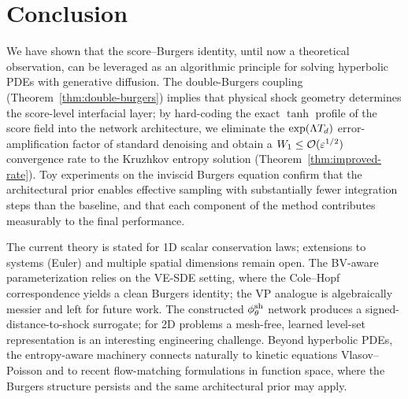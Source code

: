 %
\section{Conclusion}
\label{sec:conclusion}

We have shown that the score--Burgers identity, until now a theoretical observation, can be leveraged as an algorithmic principle for solving hyperbolic {PDE}s with generative diffusion. The double-Burgers coupling (Theorem~\ref{thm:double-burgers}) implies that physical shock geometry determines the score-level interfacial layer; by hard-coding the exact $\tanh$ profile of the score field into the network architecture, we eliminate the $\exp(\Lambda T_{d})$ error-amplification factor of standard denoising and obtain a $W_{1}\le\mathcal{O}(\varepsilon^{1/2})$ convergence rate to the Kruzhkov entropy solution (Theorem~\ref{thm:improved-rate}). Toy experiments on the inviscid Burgers equation confirm that the architectural prior enables effective sampling with substantially fewer integration steps than the baseline, and that each component of the method contributes measurably to the final performance.

The current theory is stated for 1D scalar conservation laws; extensions to systems (Euler) and multiple spatial dimensions remain open. The BV-aware parameterization relies on the {VE-SDE} setting, where the Cole--Hopf correspondence yields a clean Burgers identity; the {VP} analogue is algebraically messier and left for future work. The constructed $\phi^{\mathrm{sh}}_{\theta}$ network produces a signed-distance-to-shock surrogate; for 2D problems a mesh-free, learned level-set representation is an interesting engineering challenge. Beyond hyperbolic {PDE}s, the entropy-aware machinery connects naturally to kinetic equations {Vlasov--Poisson} and to recent flow-matching formulations in function space, where the Burgers structure persists and the same architectural prior may apply.
